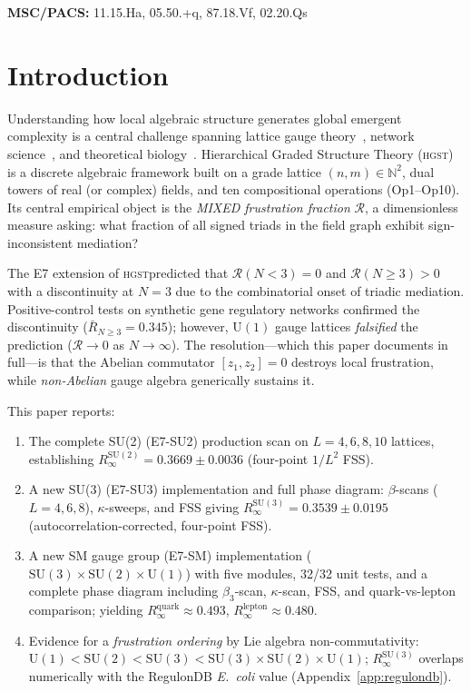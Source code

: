 \documentclass[12pt,a4paper]{article}
\newcommand{\R}{\mathcal{R}}           %
\newcommand{\hgst}{\textsc{hgst}}
\newcommand{\SU}[1]{\mathrm{SU}(#1)}
\newcommand{\UN}[1]{\mathrm{U}(#1)}
\newcommand{\SM}{\SU{3}\!\times\!\SU{2}\!\times\!\UN{1}}
\theoremstyle{plain}
\theoremstyle{definition}
\theoremstyle{remark}
\begin{document}
\vspace{6pt}
\noindent\textbf{MSC/PACS:} 11.15.Ha, 05.50.+q, 87.18.Vf, 02.20.Qs

\newpage
\tableofcontents
\newpage

\section{Introduction}
\label{sec:intro}

Understanding how local algebraic structure generates global emergent complexity is a
central challenge spanning lattice gauge theory~\citep{Wilson1974}, network
science~\citep{Barabasi2004}, and theoretical biology~\citep{Alon2007}.
Hierarchical Graded Structure Theory (\hgst) is a discrete algebraic framework built on
a grade lattice $(n,m)\in\mathbb{N}^2$, dual towers of real (or complex) fields, and ten
compositional operations (Op1--Op10).
Its central empirical object is the \emph{MIXED frustration fraction} $\R$, 
a dimensionless measure asking: what fraction of all signed triads in the field graph
exhibit sign-inconsistent mediation?

The E7 extension of \hgst predicted that $\R(N<3)=0$ and $\R(N\geq 3)>0$ with a
discontinuity at $N=3$ due to the combinatorial onset of triadic mediation.
Positive-control tests on synthetic gene regulatory networks confirmed the discontinuity
($\bar{R}_{N\ge3}=0.345$); however, $\UN{1}$ gauge lattices \emph{falsified} the
prediction ($\R\to 0$ as $N\to\infty$).
The resolution---which this paper documents in full---is that the Abelian commutator
$[z_1,z_2]=0$ destroys local frustration, while \emph{non-Abelian} gauge algebra
generically sustains it.

This paper reports:
\begin{enumerate}[leftmargin=1.5em]
  \item The complete SU(2) (E7-SU2) production scan on $L=4,6,8,10$ lattices, establishing
        $R_\infty^{\SU{2}}=0.3669\pm0.0036$ (four-point $1/L^2$ FSS).
  \item A new SU(3) (E7-SU3) implementation and full phase diagram:
        $\beta$-scans ($L=4,6,8$), $\kappa$-sweeps, and FSS giving
        $R_\infty^{\SU{3}}=0.3539\pm0.0195$ (autocorrelation-corrected, four-point FSS).
  \item A new SM gauge group (E7-SM) implementation
        ($\SM$) with five modules, 32/32 unit tests, and a complete
        phase diagram including $\beta_3$-scan, $\kappa$-scan, FSS, and
        quark-vs-lepton comparison; yielding
        $R_\infty^\text{quark}\approx 0.493$,
        $R_\infty^\text{lepton}\approx 0.480$.
  \item Evidence for a \emph{frustration ordering} by Lie algebra
        non-commutativity: $\UN{1}<\SU{2}<\SU{3}<\SM$;
        $R_\infty^{\SU{3}}$ overlaps numerically with the RegulonDB
        \textit{E.~coli} value (Appendix~\ref{app:regulondb}).
\end{enumerate}
\end{document}
